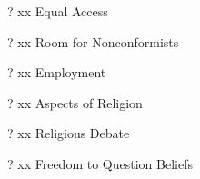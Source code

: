 ?	xx  Equal Access   %

?	xx  Room for Nonconformists   %

?	xx  Employment   %

?	xx  Aspects of Religion   %

?	xx  Religious Debate   %

?	xx  Freedom to Question Beliefs   %

